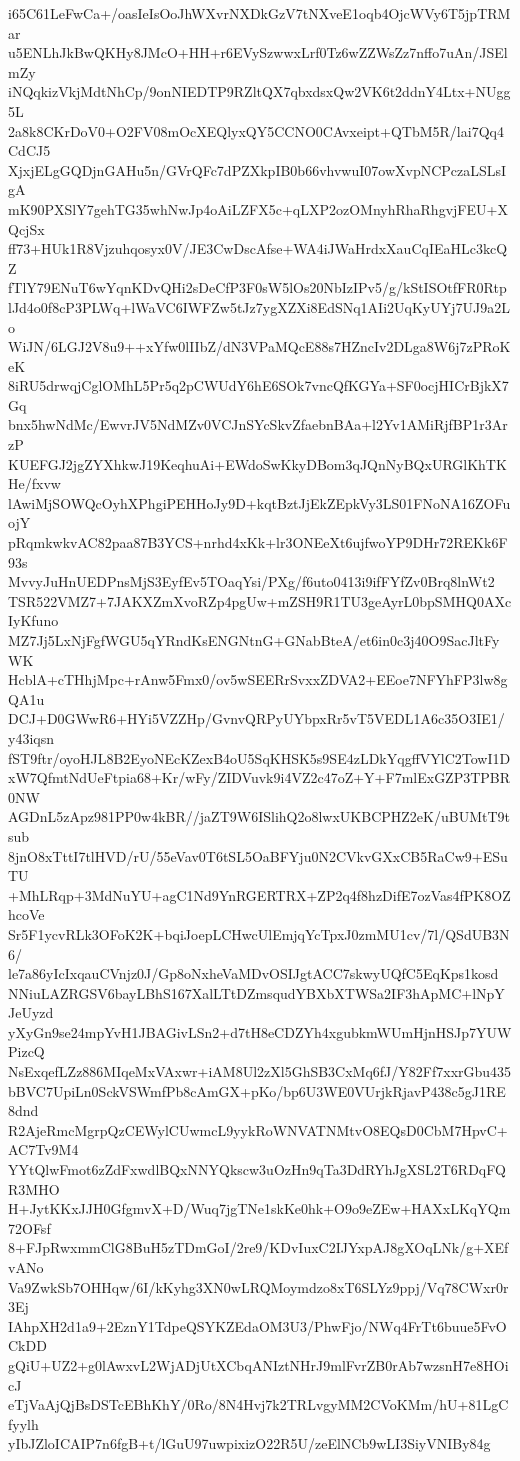 i65C61LeFwCa+/oasIeIsOoJhWXvrNXDkGzV7tNXveE1oqb4OjcWVy6T5jpTRMar
u5ENLhJkBwQKHy8JMcO+HH+r6EVySzwwxLrf0Tz6wZZWsZz7nffo7uAn/JSElmZy
iNQqkizVkjMdtNhCp/9onNIEDTP9RZltQX7qbxdsxQw2VK6t2ddnY4Ltx+NUgg5L
2a8k8CKrDoV0+O2FV08mOcXEQlyxQY5CCNO0CAvxeipt+QTbM5R/lai7Qq4CdCJ5
XjxjELgGQDjnGAHu5n/GVrQFc7dPZXkpIB0b66vhvwuI07owXvpNCPczaLSLsIgA
mK90PXSlY7gehTG35whNwJp4oAiLZFX5c+qLXP2ozOMnyhRhaRhgvjFEU+XQcjSx
ff73+HUk1R8Vjzuhqosyx0V/JE3CwDscAfse+WA4iJWaHrdxXauCqIEaHLc3kcQZ
fTlY79ENuT6wYqnKDvQHi2sDeCfP3F0sW5lOs20NbIzIPv5/g/kStISOtfFR0Rtp
lJd4o0f8cP3PLWq+lWaVC6IWFZw5tJz7ygXZXi8EdSNq1AIi2UqKyUYj7UJ9a2Lo
WiJN/6LGJ2V8u9++xYfw0lIIbZ/dN3VPaMQcE88s7HZncIv2DLga8W6j7zPRoKeK
8iRU5drwqjCglOMhL5Pr5q2pCWUdY6hE6SOk7vncQfKGYa+SF0ocjHICrBjkX7Gq
bnx5hwNdMc/EwvrJV5NdMZv0VCJnSYcSkvZfaebnBAa+l2Yv1AMiRjfBP1r3ArzP
KUEFGJ2jgZYXhkwJ19KeqhuAi+EWdoSwKkyDBom3qJQnNyBQxURGlKhTKHe/fxvw
lAwiMjSOWQcOyhXPhgiPEHHoJy9D+kqtBztJjEkZEpkVy3LS01FNoNA16ZOFuojY
pRqmkwkvAC82paa87B3YCS+nrhd4xKk+lr3ONEeXt6ujfwoYP9DHr72REKk6F93s
MvvyJuHnUEDPnsMjS3EyfEv5TOaqYsi/PXg/f6uto0413i9ifFYfZv0Brq8lnWt2
TSR522VMZ7+7JAKXZmXvoRZp4pgUw+mZSH9R1TU3geAyrL0bpSMHQ0AXcIyKfuno
MZ7Jj5LxNjFgfWGU5qYRndKsENGNtnG+GNabBteA/et6in0c3j40O9SacJltFyWK
HcblA+cTHhjMpc+rAnw5Fmx0/ov5wSEERrSvxxZDVA2+EEoe7NFYhFP3lw8gQA1u
DCJ+D0GWwR6+HYi5VZZHp/GvnvQRPyUYbpxRr5vT5VEDL1A6c35O3IE1/y43iqsn
fST9ftr/oyoHJL8B2EyoNEcKZexB4oU5SqKHSK5s9SE4zLDkYqgffVYlC2TowI1D
xW7QfmtNdUeFtpia68+Kr/wFy/ZIDVuvk9i4VZ2c47oZ+Y+F7mlExGZP3TPBR0NW
AGDnL5zApz981PP0w4kBR//jaZT9W6ISlihQ2o8lwxUKBCPHZ2eK/uBUMtT9tsub
8jnO8xTttI7tlHVD/rU/55eVav0T6tSL5OaBFYju0N2CVkvGXxCB5RaCw9+ESuTU
+MhLRqp+3MdNuYU+agC1Nd9YnRGERTRX+ZP2q4f8hzDifE7ozVas4fPK8OZhcoVe
Sr5F1ycvRLk3OFoK2K+bqiJoepLCHwcUlEmjqYcTpxJ0zmMU1cv/7l/QSdUB3N6/
le7a86yIcIxqauCVnjz0J/Gp8oNxheVaMDvOSIJgtACC7skwyUQfC5EqKps1kosd
NNiuLAZRGSV6bayLBhS167XalLTtDZmsqudYBXbXTWSa2IF3hApMC+lNpYJeUyzd
yXyGn9se24mpYvH1JBAGivLSn2+d7tH8eCDZYh4xgubkmWUmHjnHSJp7YUWPizcQ
NsExqefLZz886MIqeMxVAxwr+iAM8Ul2zXl5GhSB3CxMq6fJ/Y82Ff7xxrGbu435
bBVC7UpiLn0SckVSWmfPb8cAmGX+pKo/bp6U3WE0VUrjkRjavP438c5gJ1RE8dnd
R2AjeRmcMgrpQzCEWylCUwmcL9yykRoWNVATNMtvO8EQsD0CbM7HpvC+AC7Tv9M4
YYtQlwFmot6zZdFxwdlBQxNNYQkscw3uOzHn9qTa3DdRYhJgXSL2T6RDqFQR3MHO
H+JytKKxJJH0GfgmvX+D/Wuq7jgTNe1skKe0hk+O9o9eZEw+HAXxLKqYQm72OFsf
8+FJpRwxmmClG8BuH5zTDmGoI/2re9/KDvIuxC2IJYxpAJ8gXOqLNk/g+XEfvANo
Va9ZwkSb7OHHqw/6I/kKyhg3XN0wLRQMoymdzo8xT6SLYz9ppj/Vq78CWxr0r3Ej
IAhpXH2d1a9+2EznY1TdpeQSYKZEdaOM3U3/PhwFjo/NWq4FrTt6buue5FvOCkDD
gQiU+UZ2+g0lAwxvL2WjADjUtXCbqANIztNHrJ9mlFvrZB0rAb7wzsnH7e8HOicJ
eTjVaAjQjBsDSTcEBhKhY/0Ro/8N4Hvj7k2TRLvgyMM2CVoKMm/hU+81LgCfyylh
yIbJZloICAIP7n6fgB+t/lGuU97uwpixizO22R5U/zeElNCb9wLI3SiyVNIBy84g
